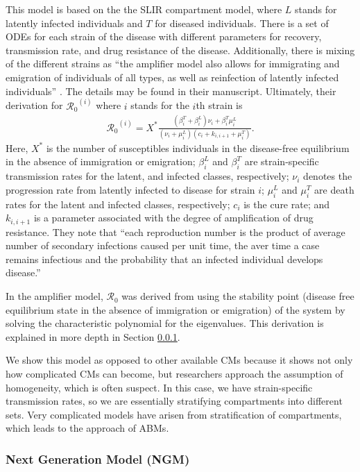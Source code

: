 \documentclass[12pt]{article}
\newcommand{\rr}{\ensuremath{\mathcal{R}_0}}
\begin{document}
This model is based on the the SLIR compartment model, where $L$ stands for latently infected individuals and $T$ for diseased individuals.  There is a set of ODEs for each strain of the disease with different parameters for recovery, transmission rate, and drug resistance of the disease.  Additionally, there is mixing of the different strains as ``the amplifier model also allows for immigrating and emigration of individuals of all types, as well as reinfection of latently infected individuals'' \citep{blower2004}.  The details may be found in their manuscript.  Ultimately, their derivation for $\rr^{(i)}$ where $i$ stands for the $i$th strain is
\begin{align*}
\rr^{(i)} = X^* \frac{ ( \beta_i^T + \beta_i^L)\nu_i + \beta_i^T \mu_i^L}{(\nu_i + \mu_i^L)(c_i + k_{i,i+1} + \mu_i^T)}.
\end{align*}
Here, $X^*$ is the number of susceptibles individuals in the disease-free equilibrium in the absence of immigration or emigration; $\beta_i^L$ and $\beta_i^T$ are strain-specific transmission rates for the latent, and infected classes, respectively; $\nu_i$ denotes the progression rate from latently infected to disease for strain $i$; $\mu_i^L$ and $\mu_i^{T}$ are death rates for the latent and infected classes, respectively; $c_i$ is the cure rate; and $k_{i, i+1}$ is a parameter associated with the degree of amplification of drug resistance.  They note that ``each reproduction number is the product of average number of secondary infections caused per unit time, the aver time a case remains infectious and the probability that an infected individual develops disease.''

In the amplifier model, $\rr$ was derived from using the stability point (disease free equilibrium state in the absence of immigration or emigration) of the system by solving the characteristic polynomial for the eigenvalues.  This derivation is explained in more depth in Section \ref{sec:ngm}.

We show this model as opposed to other available CMs because it shows not only how complicated CMs can become, but researchers approach the assumption of homogeneity, which is often suspect.  In this case, we have strain-specific transmission rates, so we are essentially stratifying compartments into different sets.  Very complicated models have arisen from stratification of compartments, which leads to the approach of ABMs.


\subsubsection{Next Generation Model (NGM)}
\label{sec:ngm}
\end{document}
